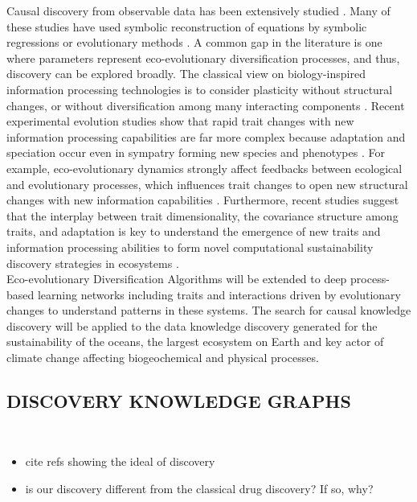 \documentclass[12pt,a4paper]{article}
\begin{document}
Causal discovery from observable data has been extensively studied \citep{Rackauckas2020}. Many of these studies have used symbolic reconstruction of equations by symbolic regressions or evolutionary methods \citep{Koza1992, quade2016prediction, tanevski2020combinatorial}. A common gap in the literature is one where parameters represent eco-evolutionary diversification processes, and thus, discovery can be explored broadly. The classical view on biology-inspired information processing technologies is to consider plasticity without structural changes, or without diversification among many interacting components \citep{DARWISH2018231}. Recent experimental evolution studies show that rapid trait changes with new information processing capabilities are far more complex because adaptation and speciation occur even in sympatry forming new species and phenotypes \citep{Seehausen2014}. For example, eco-evolutionary dynamics strongly affect feedbacks between ecological and evolutionary processes, which influences trait changes to open new structural changes with new information capabilities \citep{Govaertetal2019}. Furthermore, recent studies suggest that the interplay between trait dimensionality, the covariance structure among traits, and adaptation is key to understand the emergence of new traits and information processing abilities to form novel computational sustainability discovery strategies in ecosystems \cite{zora172044}.\\

Eco-evolutionary Diversification Algorithms will be extended to deep process-based learning networks including traits and interactions driven by evolutionary changes to understand patterns in these systems. The search for causal knowledge discovery will be applied to the data knowledge discovery generated for the sustainability of the oceans, the largest ecosystem on Earth and key actor of climate change affecting biogeochemical and physical processes. 

\subsection{DISCOVERY KNOWLEDGE GRAPHS}
\\
\begin{itemize}
    \item cite refs showing the ideal of discovery
    \item is our discovery different from the classical drug discovery? If so, why?
\end{itemize}
\end{document}
